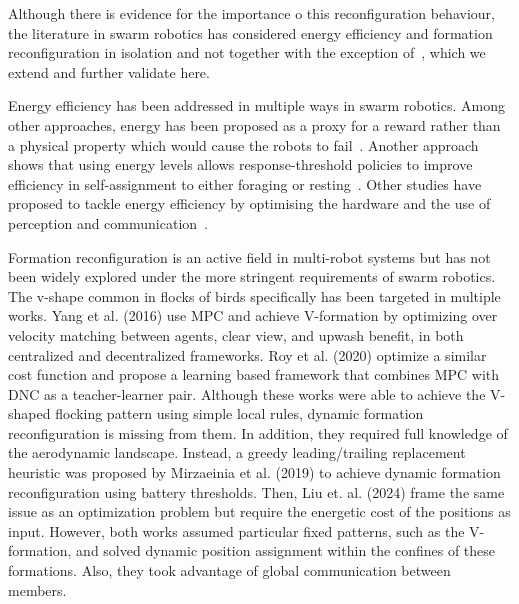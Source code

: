 \documentclass[runningheads]{llncs}
\begin{document}
Although there is evidence for the importance o this reconfiguration behaviour, the literature in swarm robotics has considered energy efficiency and formation reconfiguration in isolation and not together with the exception of~\cite{mahdavi2026energy}, which we extend and further validate here.

Energy efficiency has been addressed in multiple ways in swarm robotics. Among other approaches, energy has been proposed as a proxy for a reward rather than a physical property which would cause the robots to fail~\cite{Elfwing2005,Weel2012,Haasdijk2013}. Another approach shows that using energy levels allows response-threshold policies to improve efficiency in self-assignment to either foraging or resting~\cite{Wenguo2007}. Other studies have proposed to tackle energy efficiency by optimising the hardware and the use of perception and communication~\cite{Yasin2021,Zhang2023,Ren2024}.

Formation reconfiguration is an active field in multi-robot systems but has not been widely explored under the more stringent requirements of swarm robotics. The v-shape common in flocks of birds specifically has been targeted in multiple works.
Yang et al. (2016)\cite{Yang2016} use MPC and achieve V-formation by optimizing over velocity matching between agents, clear view, and upwash benefit, in both centralized and decentralized frameworks. Roy et al. (2020)\cite{Roy2020} optimize a similar cost function and propose a learning based framework that combines MPC with DNC as a teacher-learner pair. Although these works were able to achieve the V-shaped flocking pattern using simple local rules, dynamic formation reconfiguration is missing from them. In addition, they required full knowledge of the aerodynamic landscape. Instead, a greedy leading/trailing replacement heuristic was proposed by Mirzaeinia et al. (2019)\cite{Mirzaeinia2019} to achieve dynamic formation reconfiguration using battery thresholds. Then, Liu et. al. (2024)\cite{Liu2024}\cite{2Liu2024} frame the same issue as an optimization problem but require the energetic cost of the positions as input. However, both works assumed particular fixed patterns, such as the V-formation, and solved dynamic position assignment within the confines of these formations. Also, they took advantage of global communication between members.
\end{document}
